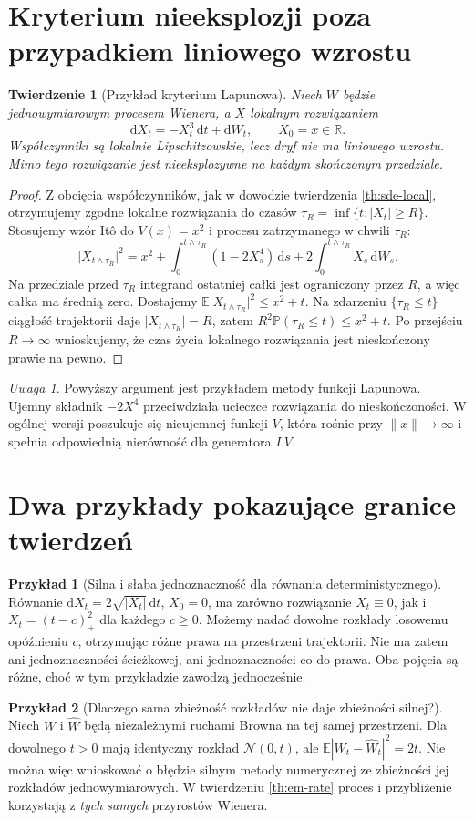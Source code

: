 \documentclass[11pt,a4paper,oneside]{report}
\numberwithin{equation}{chapter}
\theoremstyle{plain}
\newtheorem{twierdzenie}{Twierdzenie}[chapter]
\theoremstyle{definition}
\newtheorem{przyklad}{Przykład}[chapter]
\theoremstyle{remark}
\newtheorem{uwaga}{Uwaga}[chapter]
\newcommand{\R}{\mathbb{R}}
\newcommand{\Prob}{\mathbb{P}}
\newcommand{\E}{\mathbb{E}}
\newcommand{\dd}{\mathrm{d}}
\newcommand{\norm}[1]{\lVert #1\rVert}
\newcommand{\abs}[1]{\lvert #1\rvert}
\newcommand{\Normal}{\mathcal{N}}
\begin{document}
\section{Kryterium nieeksplozji poza przypadkiem liniowego wzrostu}
\begin{twierdzenie}[Przykład kryterium Lapunowa]
\label{th:lyapunov-example}
Niech $W$ będzie jednowymiarowym procesem Wienera,
a $X$ lokalnym rozwiązaniem
\[
\dd X_t=-X_t^3\,\dd t+\dd W_t,\qquad X_0=x\in\R.
\]
Współczynniki są lokalnie Lipschitzowskie, lecz dryf
nie ma liniowego wzrostu. Mimo tego rozwiązanie jest
nieeksplozywne na każdym skończonym przedziale.
\end{twierdzenie}
\begin{proof}
Z obcięcia współczynników, jak w dowodzie twierdzenia
\ref{th:sde-local}, otrzymujemy zgodne lokalne
rozwiązania do czasów $\tau_R=\inf\{t:\abs{X_t}\ge R\}$.
Stosujemy wzór Itô do $V(x)=x^2$ i procesu
zatrzymanego w chwili $\tau_R$:
\[
\abs{X_{t\wedge\tau_R}}^2
=x^2+\int_0^{t\wedge\tau_R}(1-2X_s^4)\,\dd s
+2\int_0^{t\wedge\tau_R}X_s\,\dd W_s.
\]
Na przedziale przed $\tau_R$ integrand ostatniej
całki jest ograniczony przez $R$, a więc całka
ma średnią zero. Dostajemy
$\E\abs{X_{t\wedge\tau_R}}^2\le x^2+t$.
Na zdarzeniu $\{\tau_R\le t\}$ ciągłość trajektorii
daje $\abs{X_{t\wedge\tau_R}}=R$, zatem
$R^2\Prob(\tau_R\le t)\le x^2+t$.
Po przejściu $R\to\infty$ wnioskujemy, że czas
życia lokalnego rozwiązania jest nieskończony
prawie na pewno.
\end{proof}

\begin{uwaga}
Powyższy argument jest przykładem metody funkcji
Lapunowa. Ujemny składnik $-2X^4$ przeciwdziała
ucieczce rozwiązania do nieskończoności. W ogólnej
wersji poszukuje się nieujemnej funkcji $V$, która
rośnie przy $\norm{x}\to\infty$ i spełnia odpowiednią
nierówność dla generatora $LV$.
\end{uwaga}

\section{Dwa przykłady pokazujące granice twierdzeń}
\begin{przyklad}[Silna i słaba jednoznaczność dla równania deterministycznego]
Równanie $\dd X_t=2\sqrt{|X_t|}\,\dd t$, $X_0=0$,
ma zarówno rozwiązanie $X_t\equiv0$, jak i
$X_t=(t-c)_+^2$ dla każdego $c\ge0$.
Możemy nadać dowolne rozkłady losowemu opóźnieniu $c$,
otrzymując różne prawa na przestrzeni trajektorii.
Nie ma zatem ani jednoznaczności ścieżkowej, ani
jednoznaczności co do prawa. Oba pojęcia są różne,
choć w tym przykładzie zawodzą jednocześnie.
\end{przyklad}
\begin{przyklad}[Dlaczego sama zbieżność rozkładów nie daje zbieżności silnej?]
Niech $W$ i $\widehat W$ będą niezależnymi ruchami Browna
na tej samej przestrzeni. Dla dowolnego $t>0$ mają identyczny
rozkład $\Normal(0,t)$, ale
$\E|W_t-\widehat W_t|^2=2t$.
Nie można więc wnioskować o błędzie silnym metody
numerycznej ze zbieżności jej rozkładów jednowymiarowych.
W twierdzeniu \ref{th:em-rate} proces i przybliżenie
korzystają z \emph{tych samych} przyrostów Wienera.
\end{przyklad}
\end{document}
